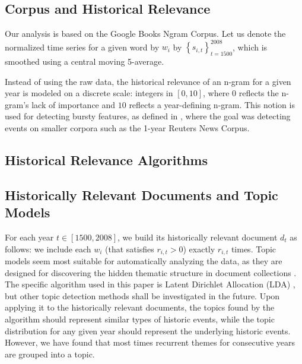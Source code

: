 
\subsection{Corpus and Historical Relevance}

Our analysis is based on the Google Books Ngram Corpus. Let us denote the normalized time series for a given word by $w_i$ by $\left\{ s_{i, t} \right\}_{t = 1500}^{2008}$, which is smoothed using a central moving 5-average.

Instead of using the raw data, the historical relevance of an n-gram for a given year is modeled on a discrete scale: integers in $\left[ 0, 10 \right]$, where $0$ reflects the n-gram's lack of importance and $10$ reflects a year-defining n-gram. This notion is used for detecting bursty features, as defined in , where the goal was detecting events on smaller corpora such as the 1-year Reuters News Corpus.

\subsection{Historical Relevance Algorithms}
\label{sec:historical-relevance-algorithms}


\subsection{Historically Relevant Documents and Topic Models}

For each year $t \in \left[ 1500, 2008 \right]$, we build its historically relevant document $d_t$ as follows: we include each $w_i$ (that satisfies $r_{i, t} > 0$) exactly $r_{i, t}$ times. Topic models seem most suitable for automatically analyzing the data, as they are designed for discovering the hidden thematic structure in document collections . The specific algorithm used in this paper is Latent Dirichlet Allocation (LDA) , but other topic detection methods shall be investigated in the future. Upon applying it to the historically relevant documents, the topics found by the algorithm should represent similar types of historic events, while the topic distribution for any given year should represent the underlying historic events. However, we have found that most times recurrent themes for consecutive years are grouped into a topic.
